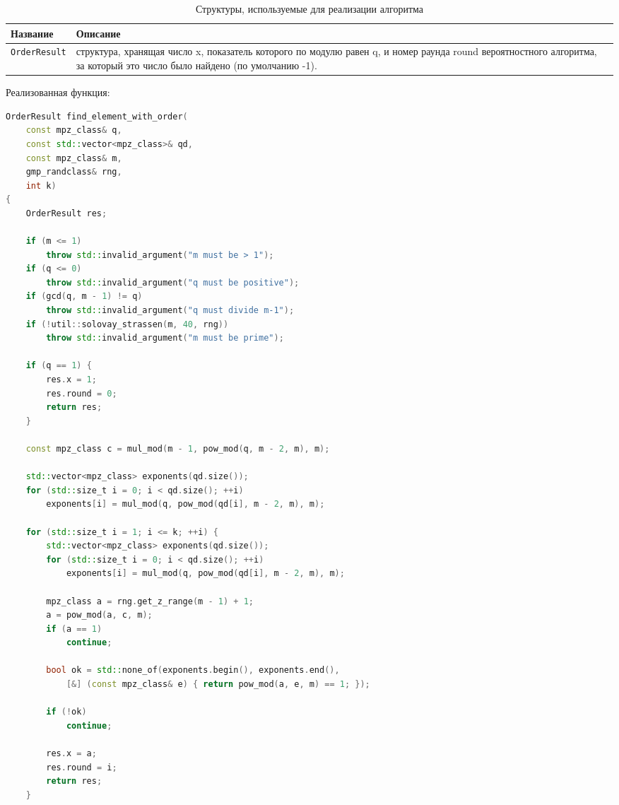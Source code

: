 \documentclass[14pt,a4paper]{extarticle}
\begin{document}
\begin{spacing}{1.5}
\begin{table}[H]
\caption{Структуры, используемые для реализации алгоритма}
\begin{tabularx}{\textwidth}{|l|X|}
\hline
\textbf{Название} & \textbf{Описание} \\
\hline
\texttt{OrderResult} & структура, хранящая число x, показатель которого по модулю равен q, и номер раунда round вероятностного алгоритма, за который это число было найдено (по умолчанию -1). \\
\hline
\end{tabularx}
\end{table}

Реализованная функция:
\begin{lstlisting}[language=C++]
OrderResult find_element_with_order(
    const mpz_class& q, 
    const std::vector<mpz_class>& qd, 
    const mpz_class& m, 
    gmp_randclass& rng, 
    int k) 
{
    OrderResult res;
    
    if (m <= 1)
        throw std::invalid_argument("m must be > 1");
    if (q <= 0)
        throw std::invalid_argument("q must be positive");
    if (gcd(q, m - 1) != q)
        throw std::invalid_argument("q must divide m-1");
    if (!util::solovay_strassen(m, 40, rng))
        throw std::invalid_argument("m must be prime");

    if (q == 1) {
        res.x = 1;
        res.round = 0;
        return res;
    }

    const mpz_class c = mul_mod(m - 1, pow_mod(q, m - 2, m), m);

    std::vector<mpz_class> exponents(qd.size());
    for (std::size_t i = 0; i < qd.size(); ++i)
        exponents[i] = mul_mod(q, pow_mod(qd[i], m - 2, m), m);

    for (std::size_t i = 1; i <= k; ++i) {
        std::vector<mpz_class> exponents(qd.size());
        for (std::size_t i = 0; i < qd.size(); ++i)
            exponents[i] = mul_mod(q, pow_mod(qd[i], m - 2, m), m);
        
        mpz_class a = rng.get_z_range(m - 1) + 1;
        a = pow_mod(a, c, m);
        if (a == 1)
            continue;
        
        bool ok = std::none_of(exponents.begin(), exponents.end(),
            [&] (const mpz_class& e) { return pow_mod(a, e, m) == 1; });
        
        if (!ok)
            continue;
        
        res.x = a;
        res.round = i;
        return res;
    }
    

\end{lstlisting}
\end{spacing}
\end{document}
